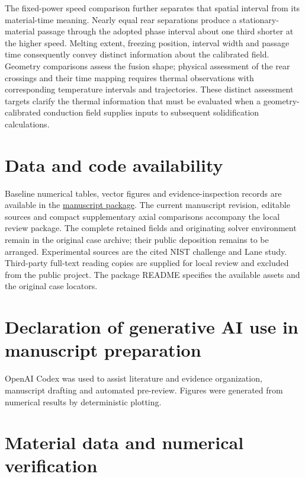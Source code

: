 \documentclass[preprint,12pt]{elsarticle}
\begin{document}
The fixed-power speed comparison further separates that spatial interval from its material-time meaning. Nearly equal rear separations produce a stationary-material passage through the adopted phase interval about one third shorter at the higher speed. Melting extent, freezing position, interval width and passage time consequently convey distinct information about the calibrated field. Geometry comparisons assess the fusion shape; physical assessment of the rear crossings and their time mapping requires thermal observations with corresponding temperature intervals and trajectories. These distinct assessment targets clarify the thermal information that must be evaluated when a geometry-calibrated conduction field supplies inputs to subsequent solidification calculations.

\section*{Data and code availability}
Baseline numerical tables, vector figures and evidence-inspection records are available in the \href{https://github.com/1187124906zty-commits/research-workflow/tree/codex/researchflow-release/paper/ammt-study}{manuscript package}. The current manuscript revision, editable sources and compact supplementary axial comparisons accompany the local review package. The complete retained fields and originating solver environment remain in the original case archive; their public deposition remains to be arranged. Experimental sources are the cited NIST challenge and Lane study. Third-party full-text reading copies are supplied for local review and excluded from the public project. The package README specifies the available assets and the original case locators.

\section*{Declaration of generative AI use in manuscript preparation}
OpenAI Codex was used to assist literature and evidence organization, manuscript drafting and automated pre-review. Figures were generated from numerical results by deterministic plotting.

\appendix
\setcounter{equation}{0}
\renewcommand{\theequation}{A.\arabic{equation}}
\renewcommand{\theHequation}{A.\arabic{equation}}
\setcounter{table}{0}
\renewcommand{\thetable}{A.\arabic{table}}
\renewcommand{\theHtable}{A.\arabic{table}}
\section{Material data and numerical verification}
\end{document}
